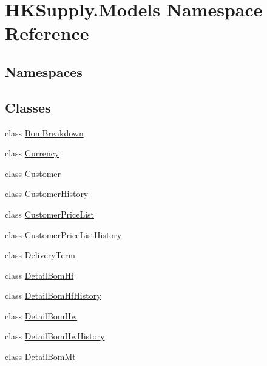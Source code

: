 \hypertarget{namespace_h_k_supply_1_1_models}{}\section{H\+K\+Supply.\+Models Namespace Reference}
\label{namespace_h_k_supply_1_1_models}
\subsection*{Namespaces}
\begin{DoxyCompactItemize}
\end{DoxyCompactItemize}
\subsection*{Classes}
\begin{DoxyCompactItemize}
\item 
class \mbox{\hyperlink{class_h_k_supply_1_1_models_1_1_bom_breakdown}{Bom\+Breakdown}}
\item 
class \mbox{\hyperlink{class_h_k_supply_1_1_models_1_1_currency}{Currency}}
\item 
class \mbox{\hyperlink{class_h_k_supply_1_1_models_1_1_customer}{Customer}}
\item 
class \mbox{\hyperlink{class_h_k_supply_1_1_models_1_1_customer_history}{Customer\+History}}
\item 
class \mbox{\hyperlink{class_h_k_supply_1_1_models_1_1_customer_price_list}{Customer\+Price\+List}}
\item 
class \mbox{\hyperlink{class_h_k_supply_1_1_models_1_1_customer_price_list_history}{Customer\+Price\+List\+History}}
\item 
class \mbox{\hyperlink{class_h_k_supply_1_1_models_1_1_delivery_term}{Delivery\+Term}}
\item 
class \mbox{\hyperlink{class_h_k_supply_1_1_models_1_1_detail_bom_hf}{Detail\+Bom\+Hf}}
\item 
class \mbox{\hyperlink{class_h_k_supply_1_1_models_1_1_detail_bom_hf_history}{Detail\+Bom\+Hf\+History}}
\item 
class \mbox{\hyperlink{class_h_k_supply_1_1_models_1_1_detail_bom_hw}{Detail\+Bom\+Hw}}
\item 
class \mbox{\hyperlink{class_h_k_supply_1_1_models_1_1_detail_bom_hw_history}{Detail\+Bom\+Hw\+History}}
\item 
class \mbox{\hyperlink{class_h_k_supply_1_1_models_1_1_detail_bom_mt}{Detail\+Bom\+Mt}}
\item 

\end{DoxyCompactItemize}
